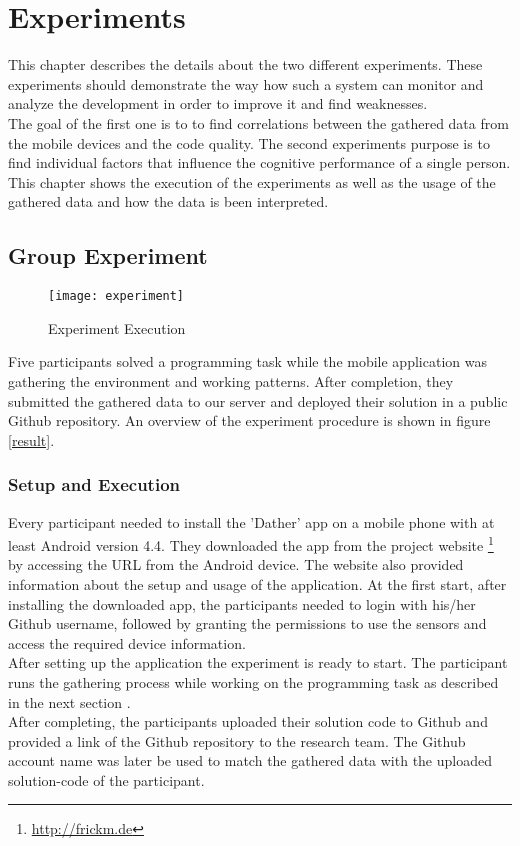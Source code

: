 \chapter{Experiments}
This chapter describes the details about the two different experiments.
These experiments should demonstrate the way how such a system can monitor and analyze the development in order to improve it and find weaknesses.\\
The goal of the first one is to to find correlations between the gathered data from the mobile devices and the code quality. The second experiments purpose is to find individual factors that influence the cognitive performance of a single person.
\bigbreak
This chapter shows the execution of the experiments as well as the usage of the gathered data and how the data is been interpreted. 

\section{Group Experiment}

\begin{figure}
\texttt{[image: experiment]}
\caption{Experiment Execution}\label{experiment}
\vspace{10 mm}
\end{figure}

Five participants solved a programming task while the mobile application was gathering the environment and working patterns. 
After completion, they submitted the gathered data to our server and deployed their solution in a public Github repository. 
An overview of the experiment procedure is shown in figure \ref{result}.
 
\subsection{Setup and Execution}
Every participant needed to install the 'Dather' app on a mobile phone with at least Android version 4.4.  
They downloaded the app from the project website \footnote{\url{http://frickm.de}} by accessing the URL from the Android device. The website also provided information about the setup and usage of the application. 
\bigbreak
At the first start, after installing the downloaded app, the participants needed to login with his/her Github username, followed by granting the permissions to use the sensors and access the required device information.\\
After setting up the application the experiment is ready to start. 
The participant runs the gathering process while working on the programming task as described in the next section .\\
After completing, the participants uploaded their solution code to Github and provided a link of the Github repository to the research team. The Github account name was later be used to match the gathered data with the uploaded solution-code of the participant. 

